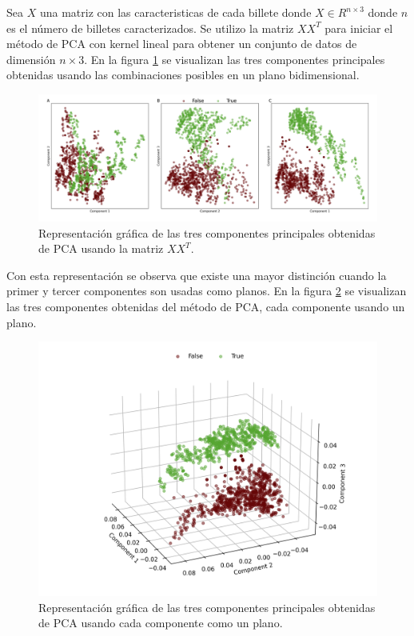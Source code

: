 Sea $X$ una matriz con las caracteristicas de cada billete donde $X\in R^{n\times 3}$ donde $n$ es el número de billetes caracterizados. Se utilizo la matriz $XX^T$ para iniciar el método de PCA con kernel lineal para obtener un conjunto de datos de dimensión $n\times 3$. En la figura \ref{fig:pca_2d} se visualizan las tres componentes principales obtenidas usando las combinaciones posibles en un plano bidimensional.

\begin{figure}[H]
    \centering
    \includegraphics[width=16cm]{Graphics/Problema_04/PCA_2D.png}
    \caption{Representación gráfica de las tres componentes principales obtenidas de PCA usando la matriz $XX^T$.}
    \label{fig:pca_2d}
\end{figure}

Con esta representación se observa que existe una mayor distinción cuando la primer y tercer componentes son usadas como planos. En la figura \ref{fig:pca_3d} se visualizan las tres componentes obtenidas del método de PCA, cada componente usando un plano.

\begin{figure}[H]
    \centering
    \includegraphics[width=16cm]{Graphics/Problema_04/PCA_3D.png}
    \caption{Representación gráfica de las tres componentes principales obtenidas de PCA usando cada componente como un plano.}
    \label{fig:pca_3d}
\end{figure}

